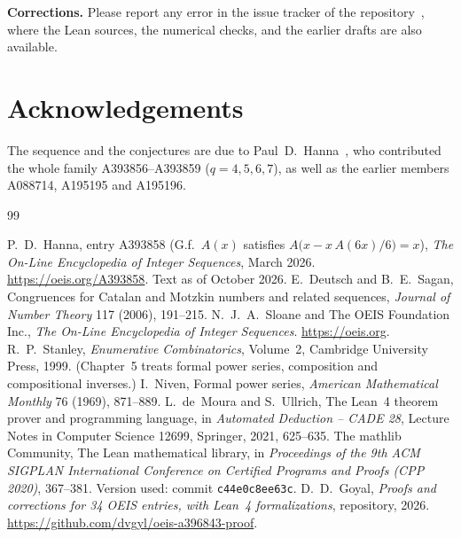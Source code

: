 \documentclass[11pt,a4paper]{article}
\theoremstyle{definition}
\theoremstyle{remark}
\newcommand{\para}[1]{\par\medskip\noindent\textbf{#1}\enspace}
\begin{document}
\para{Corrections.} Please report any error in the issue tracker of the repository~\cite{repo}, where the Lean
sources, the numerical checks, and the earlier drafts are also available.

\section*{Acknowledgements}
The sequence and the conjectures are due to Paul~D.~Hanna~\cite{oeis}, who contributed
the whole family A393856--A393859 ($q=4,5,6,7$), as well as the earlier members A088714, A195195 and A195196.

\begin{thebibliography}{99}\small
\raggedright
{} P.~D.~Hanna, entry A393858 (G.f.\ $A(x)$ satisfies $A\bigl(x-x\,A(6x)/6\bigr)=x$), \emph{The On-Line Encyclopedia of Integer Sequences}, March 2026. \url{https://oeis.org/A393858}. Text as of October 2026.
 E.~Deutsch and B.~E.~Sagan, Congruences for Catalan and Motzkin numbers and related sequences, \emph{Journal of Number Theory} 117 (2006), 191--215.
 N.~J.~A.~Sloane and The OEIS Foundation Inc., \emph{The On-Line Encyclopedia of Integer Sequences}. \url{https://oeis.org}.
 R.~P.~Stanley, \emph{Enumerative Combinatorics}, Volume~2, Cambridge University Press, 1999. (Chapter~5 treats formal power series, composition and compositional inverses.)
 I.~Niven, Formal power series, \emph{American Mathematical Monthly} 76 (1969), 871--889.
 L.~de~Moura and S.~Ullrich, The Lean~4 theorem prover and programming language, in \emph{Automated Deduction -- CADE 28}, Lecture Notes in Computer Science 12699, Springer, 2021, 625--635.
 The mathlib Community, The Lean mathematical library, in \emph{Proceedings of the 9th ACM SIGPLAN International Conference on Certified Programs and Proofs (CPP 2020)}, 367--381. Version used: commit \texttt{c44e0c8ee63c}.
 D.~D.~Goyal, \emph{Proofs and corrections for 34 OEIS entries, with Lean~4 formalizations}, repository, 2026. \url{https://github.com/dvgyl/oeis-a396843-proof}.
\end{thebibliography}
\end{document}
